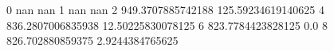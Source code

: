 0 nan nan
1 nan nan
2 949.3707885742188 125.59234619140625
4 836.2807006835938 12.50225830078125
6 823.7784423828125 0.0
8 826.702880859375 2.9244384765625
